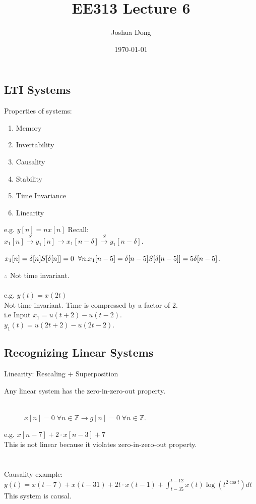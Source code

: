 \documentclass{article}
\begin{document}
\title{EE313\: Lecture 6}
\author{Joshua Dong}
\date{\today}
\maketitle

\subsection{LTI Systems}
Properties of systems:
\begin{enumerate}
    \item{Memory}
    \item{Invertability}
    \item{Causality}
    \item{Stability}
    \item{Time Invariance}
    \item{Linearity}
\end{enumerate}
e.g. $y[n] = nx[n]$
Recall: \\
$x_1[n] \xrightarrow{S} y_1[n] \rightarrow 
x_1[n-\delta] \xrightarrow{S} y_1[n-\delta]$.
\begin{multicols}{2}
$x_1[n] = \delta[n]
\\S[\delta[n]] = 0 \;\; \forall n.
\\x_1[n-5] = \delta[n-5]
\\S[\delta[n-5]] = 5\delta[n-5]$.
\end{multicols}
$\therefore$
Not time invariant.
\\\\e.g. $y(t) = x(2t)$
\\Not time invariant. Time is compressed by a factor of 2.
\\i.e Input $x_1 = u(t+2)-u(t-2)$.
\\$y_1(t) = u(2t+2) - u(2t-2)$.

\subsection{Recognizing Linear Systems}
Linearity: Rescaling + Superposition
\begin{description}
    \item[Any linear system has the zero-in-zero-out property.] \hfill \\
        $x[n] = 0 \; \forall n \in \mathbb{Z} \rightarrow g[n] = 0 \; \forall n \in \mathbb{Z} $.
\end{description}
e.g. $x[n-7] + 2 \cdot x[n-3] + 7$
\\This is not linear because it violates zero-in-zero-out property.
\\\\
\\Causality example:
\\$y(t) = x(t-7) +x(t-31) + 2t \cdot x(t-1) +
\int_{t-35}^{t-12}x(t)\log{(t^{2\cos{t}})}dt$
\\This system is causal.
\end{document}
